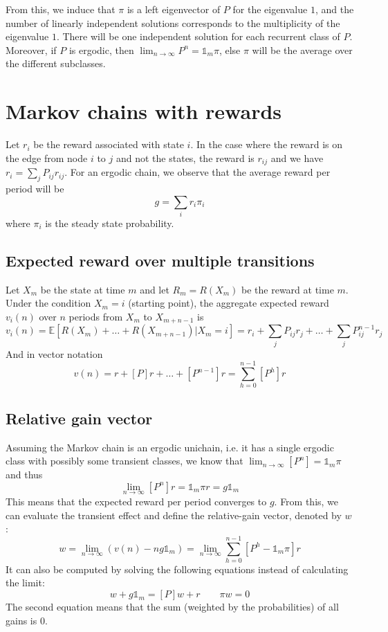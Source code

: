 \documentclass[12pt, openany]{report}
\newcommand{\E}{\mathbb{E}}
\theoremstyle{definition}
\begin{document}
From this, we induce that $\pi$ is a left eigenvector of $P$ for the eigenvalue $1$, and the number of linearly independent solutions corresponds to the multiplicity of the eigenvalue $1$. There will be one independent solution for each recurrent class of $P$. Moreover, if $P$ is ergodic, then $\displaystyle \lim_{n\to \infty} P^n = \mathbb{1}_m \pi$, else $\pi$ will be the average over the different subclasses. \\
\section{Markov chains with rewards}
Let $r_i$ be the reward associated with state $i$. In the case where the reward is on the edge from node $i$ to $j$ and not the states, the reward is $r_{ij}$ and we have $\displaystyle r_i = \sum_j P_{ij}r_{ij}$. For an ergodic chain, we observe that the average reward per period will be 
\begin{equation}
	g = \sum_i r_i\pi_i
\end{equation}
where $\pi_i$ is the steady state probability. 
\subsection{Expected reward over multiple transitions}
Let $X_m$ be the state at time $m$ and let $R_m=R(X_m)$ be the reward at time $m$. Under the condition $X_m=i$ (starting point), the aggregate expected reward $v_i(n)$ over $n$ periods from $X_m$ to $X_{m+n-1}$ is 
\begin{equation}
	v_i(n) = \E[R(X_m) + \dots + R(X_{m+n-1})|X_m = i] = r_i + \sum_j P_{ij}r_j + \dots + \sum_j P_{ij}^{n-1}r_j
\end{equation}
And in vector notation 
\begin{equation}
	v(n) = r+ [P]r + \dots + [P^{n-1}]r = \sum_{h=0}^{n-1}[P^h]r
\end{equation}
\subsection{Relative gain vector}
Assuming the Markov chain is an ergodic unichain, i.e. it has a single ergodic class with possibly some transient classes, we know that $\lim_{n\to \infty}[P^n] = \mathbb{1}_m \pi$ and thus 
\begin{equation}
	\lim_{n\to \infty} [P^n]r = \mathbb{1}_m \pi r = g\mathbb{1}_m 
\end{equation}
This means that the expected reward per period converges to $g$. From this, we can evaluate the transient effect and define the relative-gain vector, denoted by $w$:
\begin{equation}
	w = \lim_{n\to \infty}(v(n)-ng\mathbb{1}_m) = \lim_{n\to \infty}\sum_{h=0}^{n-1} [P^h-\mathbb{1}_m\pi]r
\end{equation}
It can also be computed by solving the following equations instead of calculating the limit:
\begin{equation}\label{eq:rel_gain}
	w+g\mathbb{1}_m = [P]w + r \qquad \pi w=0
\end{equation}
The second equation means that the sum (weighted by the probabilities) of all gains is 0.
\end{document}

